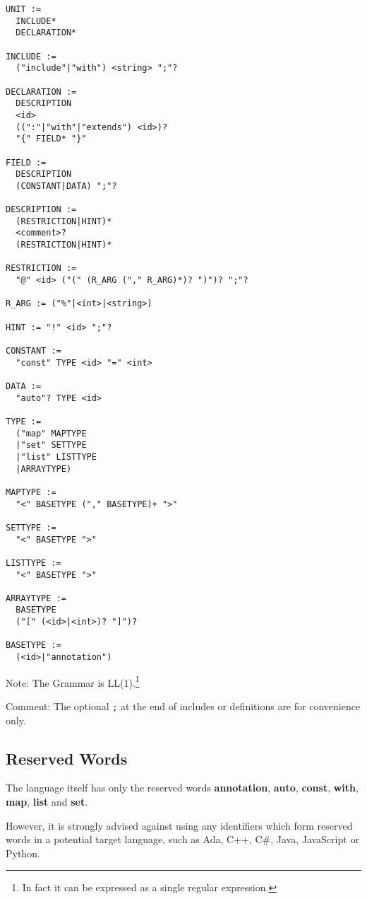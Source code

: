 \documentclass[a4paper,10pt]{article}
\begin{document}
\begin{verbatim}
UNIT :=
  INCLUDE*
  DECLARATION*

INCLUDE := 
  ("include"|"with") <string> ";"?

DECLARATION :=
  DESCRIPTION
  <id>
  ((":"|"with"|"extends") <id>)?
  "{" FIELD* "}"
  
FIELD :=
  DESCRIPTION
  (CONSTANT|DATA) ";"?
  
DESCRIPTION := 
  (RESTRICTION|HINT)*
  <comment>?
  (RESTRICTION|HINT)*
  
RESTRICTION :=
  "@" <id> ("(" (R_ARG ("," R_ARG)*)? ")")? ";"?
  
R_ARG := ("%"|<int>|<string>)

HINT := "!" <id> ";"?
  
CONSTANT :=
  "const" TYPE <id> "=" <int>
  
DATA :=
  "auto"? TYPE <id>
  
TYPE :=
  ("map" MAPTYPE
  |"set" SETTYPE
  |"list" LISTTYPE
  |ARRAYTYPE)
  
MAPTYPE :=
  "<" BASETYPE ("," BASETYPE)+ ">"
  
SETTYPE :=
  "<" BASETYPE ">"
  
LISTTYPE :=
  "<" BASETYPE ">"
  
ARRAYTYPE :=
  BASETYPE
  ("[" (<id>|<int>)? "]")?
  
BASETYPE :=
  (<id>|"annotation")

\end{verbatim}
Note: The Grammar is LL(1).\footnote{In fact it can be expressed as a single regular expression.}

Comment: The optional \texttt{;} at the end of includes or definitions are for convenience only.

\subsection{Reserved Words}

The language itself has only the reserved words \textbf{annotation}, \textbf{auto}, \textbf{const}, \textbf{with}, \textbf{map}, \textbf{list} and \textbf{set}. 

However, it is strongly advised against using any identifiers which form reserved words in a potential target language, such as Ada, C++, C\#, Java, JavaScript or Python.
\end{document}
